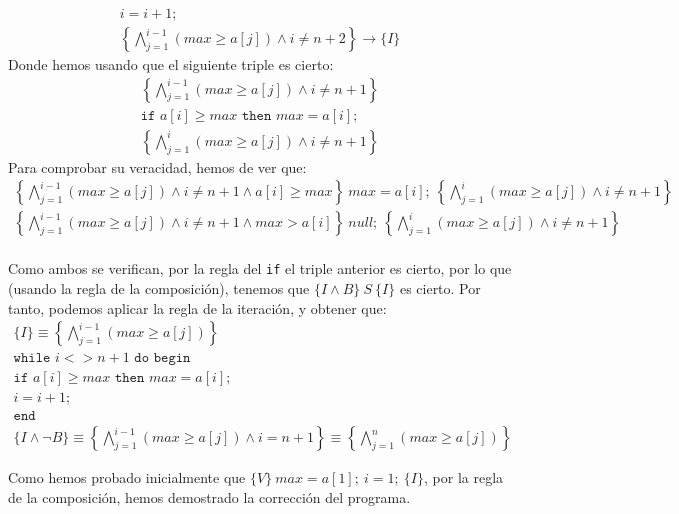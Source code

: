 \begin{ejercicio}
\begin{gather*}
        i = i +1; \\
        \left\{\bigwedge_{j=1}^{i-1} (max \geq a[j]) \land i\neq n+2\right\} \rightarrow \{I\}
    \end{gather*}
    Donde hemos usando que el siguiente triple es cierto:
    \begin{gather*}
        \left\{\bigwedge_{j=1}^{i-1} (max \geq a[j]) \land i\neq n+1\right\} \\ \texttt{if\ } a[i] \geq max \texttt{\ then\ } max = a[i];\\ \left\{\bigwedge_{j=1}^{i} (max \geq a[j]) \land i\neq n+1\right\} 
    \end{gather*}
    Para comprobar su veracidad, hemos de ver que:
    \begin{gather*}
    \left\{\bigwedge_{j=1}^{i-1} (max \geq a[j]) \land i\neq n+1 \land a[i] \geq max\right\}\ max = a[i];\ \left\{\bigwedge_{j=1}^{i} (max \geq a[j]) \land i\neq n+1\right\} \\
    \left\{\bigwedge_{j=1}^{i-1} (max \geq a[j]) \land i\neq n+1 \land max > a[i]\right\}\ null;\ \left\{\bigwedge_{j=1}^{i} (max \geq a[j]) \land i\neq n+1\right\} \\
    \end{gather*}
    
    Como ambos se verifican, por la regla del \texttt{if} el triple anterior es cierto, por lo que (usando la regla de la composición), tenemos que $\{I\land B\}\ S\ \{I\}$ es cierto. Por tanto, podemos aplicar la regla de la iteración, y obtener que:
    \begin{gather*}
        \{I\} \equiv \left\{\bigwedge_{j=1}^{i-1} (max \geq a[j])\right\} \\
        \texttt{while\ } i <> n+1 \texttt{\ do\ begin} \\
        \texttt{if\ } a[i] \geq max \texttt{\ then\ } max = a[i];\\
        i=i+1; \\
        \texttt{end} \\
        \{I \land \lnot B\} \equiv \left\{\bigwedge_{j=1}^{i-1} (max \geq a[j]) \land i=n+1\right\} \equiv \left\{\bigwedge_{j=1}^{n} (max \geq a[j])\right\}
    \end{gather*}
    
    Como hemos probado inicialmente que $\{V\}\ max = a[1];\ i=1;\ \{I\}$, por la regla de la composición, hemos demostrado la corrección del programa.
\end{ejercicio}

